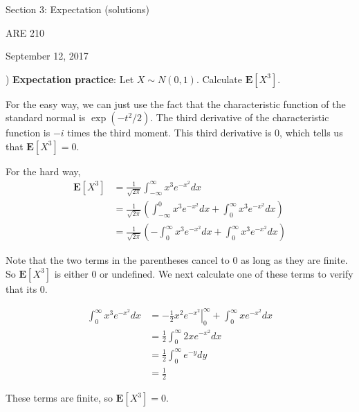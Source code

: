 \documentclass[12pt,english]{article}
\begin{document}
\begin{center}
{\Large{}Section 3: Expectation (solutions)}
\par\end{center}{\Large \par}

\begin{center}
ARE 210
\par\end{center}

\begin{center}
September 12, 2017
\par\end{center}

) \textbf{Expectation practice}: Let $X \sim N(0, 1)$. Calculate $\mathbf{E}[X^{3}]$.
\vspace{1em}

For the easy way, we can just use the fact that the characteristic function of the standard normal is $\exp(-t^{2} / 2)$. The third derivative of the characteristic function is $-i$ times the third moment. This third derivative is 0, which tells us that $\mathbf{E}[X^{3}] = 0$.

For the hard way,
\begin{align*}
\mathbf{E}[X^{3}] & = \frac{1}{\sqrt{2\pi}} \int_{-\infty}^{\infty} x^{3} e^{-x^{2}} dx \\
& = \frac{1}{\sqrt{2\pi}} \left( \int_{-\infty}^{0} x^{3} e^{-x^{2}} dx + \int_{0}^{\infty} x^{3} e^{-x^{2}} dx \right) \\
& = \frac{1}{\sqrt{2\pi}} \left( - \int_{0}^{\infty} x^{3} e^{-x^{2}} dx + \int_{0}^{\infty} x^{3} e^{-x^{2}} dx \right)
\end{align*}

Note that the two terms in the parentheses cancel to 0 as long as they are finite. So $\mathbf{E}[X^{3}]$ is either 0 or undefined. We next calculate one of these terms to verify that its 0.

\begin{align*}
\int_{0}^{\infty} x^{3} e^{-x^{2}} dx & = \left. -\frac{1}{2} x^{2} e^{-x^{2}} \right|_{0}^{\infty} + \int_{0}^{\infty} x e^{-x^{2}} dx \\
& = \frac{1}{2} \int_{0}^{\infty} 2x e^{-x^{2}} dx \\
& = \frac{1}{2} \int_{0}^{\infty} e^{-y} dy \\
& = \frac{1}{2}
\end{align*}

These terms are finite, so $\mathbf{E}[X^{3}] = 0$.
\end{document}
